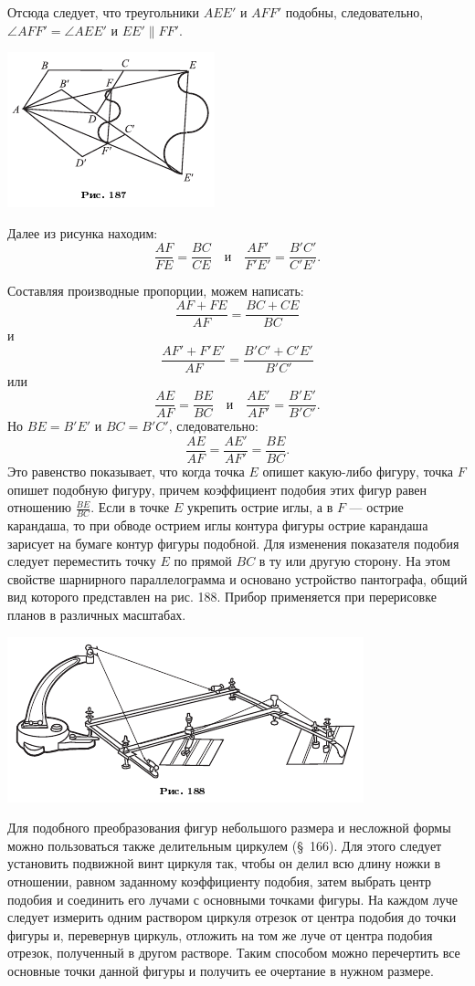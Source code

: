 \documentclass[oneside]{book}
\begin{document}
Отсюда следует, что треугольники $AEE'$ и $AFF'$ подобны, следовательно, $\angle AFF'=\angle AEE'$ и $EE'\parallel FF'$.

\includegraphics{pics/ris-187}

Далее из рисунка находим:
\[\frac{AF}{FE}=\frac{BC}{CE}
\quad\text{и}\quad
\frac{AF'}{F'E'}=\frac{B'C'}{C'E'}.\]

Составляя производные пропорции, можем написать:
\[\frac{AF+FE}{AF}=\frac{BC+CE}{BC}\]
и
\[\frac{AF'+F'E'}{AF}=\frac{B'C'+C'E'}{B'C'}\]
или
\[\frac{AE}{AF}=\frac{BE}{BC}
\quad\text{и}\quad
\frac{AE'}{AF'}=\frac{B'E'}{B'C'}.\]
Но $BE=B'E'$ и $BC=B'C'$, следовательно:
\[\frac{AE}{AF}=\frac{AE'}{AF'}=\frac{BE}{BC}.\]
Это равенство показывает, что когда точка $E$ опишет какую-либо фигуру, точка $F$ опишет подобную фигуру, причем коэффициент подобия этих фигур равен отношению $\frac{BE}{BC}$.
Если в точке $E$ укрепить острие иглы, а в $F$ --- острие карандаша, то при обводе острием иглы контура фигуры острие карандаша зарисует на бумаге контур фигуры подобной.
Для изменения показателя подобия следует переместить точку $E$ по прямой $BC$ в ту или другую сторону.
На этом свойстве шарнирного параллелограмма и основано устройство пантографа, общий вид которого представлен на рис. 188.
Прибор применяется при перерисовке планов в различных масштабах.

\includegraphics{pics/ris-188}

Для подобного преобразования фигур небольшого размера и несложной формы можно пользоваться также делительным циркулем (§~166).
Для этого следует установить подвижной винт циркуля так, чтобы он делил всю длину ножки в отношении, равном заданному коэффициенту подобия, затем выбрать центр подобия и соединить его лучами с основными точками фигуры.
На каждом луче следует измерить одним раствором циркуля отрезок от центра подобия до точки фигуры и, перевернув циркуль, отложить на том же луче от центра подобия отрезок, полученный в другом растворе.
Таким способом можно перечертить все основные точки данной фигуры и получить ее очертание в нужном размере.
\end{document}
